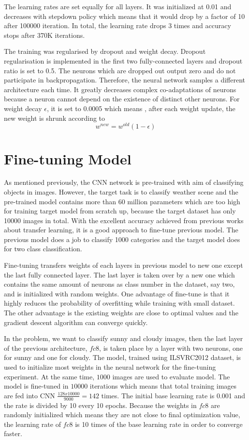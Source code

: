 The learning rates are set equally for all layers. It was initialized at 0.01 and decreases with stepdown policy which means that it would drop by a factor of 10 after 100000 iteration. In total, the learning rate drops 3 times and accuracy stops after 370K iterations. 

The training was regularised by dropout and weight decay. Dropout regularisation is implemented in the first two fully-connected layers and dropout ratio is set to 0.5. The neurons which are dropped out output zero and do not participate in backpropagation. Therefore, the neural network samples a different architecture each time. It greatly decreases complex co-adaptations of neurons because a neuron cannot depend on the existence of distinct other neurons. For weight decay $\epsilon$, it is set to 0.0005 which means , after each weight update, the new weight is shrunk according to 
\begin{equation}\label{eq:ffEq}
w^{new} = w^{old}(1 - \epsilon)
\end{equation}

\section{Fine-tuning Model}

As mentioned previously, the CNN network is pre-trained with aim of classifying objects in images. However, the target task is to classify weather scene and the pre-trained model contains more than 60 million parameters which are too high for training target model from scratch up, because the target dataset has only 10000 images in total. With the excellent accuracy achieved from previous works about transfer learning, it is a good approach to fine-tune previous model. The previous model does a job to classify 1000 categories and the target model does for two class classification. 

Fine-tuning transfers weights of each layers in previous model to new one except the last fully connected layer. The last layer is taken over by a new one which contains the same amount of neurons as class number in the dataset, say two, and is initialized with random weights. One advantage of fine-tune is that it highly reduces the probability of overfitting  while training with small dataset. The other advantage is the existing weights are close to optimal values and the gradient descent algorithm can converge quickly.

In the problem, we want to classify sunny and cloudy images, then the last layer of the previous architecture, $fc8$, is taken place by a layer with two neurons, one for sunny and one for cloudy. The model, trained using ILSVRC2012 dataset, is used to initialize most weights in the neural network for the fine-tuning experiment. At the same time, $1000$ images are used to evaluate model. The model is fine-tuned in $10000$ iterations which means that total training images are fed into CNN $\frac{128x10000}{9000}=142$ times. The initial base learning rate is 0.001 and the rate is divided by 10 every 10 epochs. Because the weights in $fc8$ are randomly initialized which means they are not close to final optimization value, the learning rate of $fc8$ is 10 times of the base learning rate in order to converge faster.

